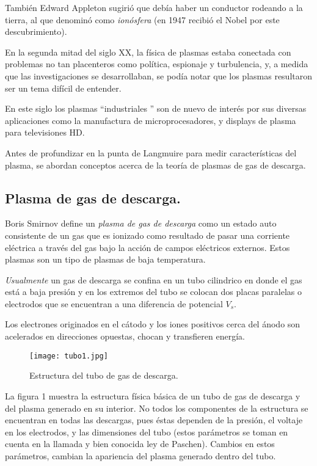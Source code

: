 \documentclass[letterpaper,12pt]{article}
\begin{document}
También Edward Appleton sugirió que debía haber un conductor rodeando a la tierra, al que denominó como \textit{ionósfera} (en  1947 recibió el Nobel por este descubrimiento). 

En la segunda mitad del siglo XX, la física de plasmas estaba conectada con problemas no tan placenteros como política, espionaje y turbulencia, y, a medida que las investigaciones se desarrollaban, se podía notar que los plasmas resultaron ser un tema difícil de entender.

En este siglo los plasmas ``industriales '' son de nuevo de interés por sus diversas aplicaciones como la manufactura de microprocesadores, y displays de plasma para televisiones HD.

Antes de profundizar en la punta de Langmuire para medir características del plasma, se abordan conceptos acerca de la teoría de plasmas de gas de descarga.

\subsection*{Plasma de gas de descarga.}

Boris Smirnov   define un \textit{plasma de gas  de descarga}  como un estado auto consistente de un gas que es  ionizado como resultado de pasar una corriente eléctrica a través del gas bajo la acción de campos eléctricos externos. Estos plasmas son un tipo de plasmas de baja temperatura. \cite{libro}

\textit{Usualmente} un gas de descarga se confina en un tubo cilindrico en donde el gas está a baja presión y  en los extremos del tubo se colocan dos placas paralelas o electrodos que se encuentran a una diferencia de potencial $V_s$.

Los electrones originados en el cátodo y los iones positivos cerca del ánodo son acelerados en direcciones opuestas, chocan y transfieren energía.

\begin{figure}[h!]
\centering
\texttt{[image: tubo1.jpg]}
\caption{Estructura del tubo de gas de descarga.}
\end{figure}

La figura 1 muestra la estructura física básica de un tubo de gas de descarga y del plasma generado en su interior. No todos los componentes de la estructura se encuentran en todas las descargas, pues éstas dependen de la presión, el voltaje en los electrodos, y las dimensiones del tubo (estos parámetros se toman en cuenta en la llamada y bien conocida ley de Paschen). Cambios en estos parámetros, cambian la apariencia del plasma generado dentro del tubo.
\end{document}
